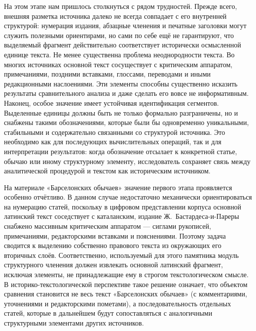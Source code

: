 На этом этапе нам пришлось столкнуться с рядом трудностей. Прежде всего, внешняя разметка источника далеко не всегда совпадает с его внутренней структурой: нумерация издания, абзацные членения и печатные заголовки могут служить полезными ориентирами, но сами по себе ещё не гарантируют, что выделяемый фрагмент действительно соответствует исторически осмысленной единице текста. Не менее существенна проблема неоднородности текста. Во многих источниках основной текст сосуществует с критическим аппаратом, примечаниями, поздними вставками, глоссами, переводами и иными редакционными наслоениями. Эти элементы способны существенно исказить результаты сравнительного анализа и даже сделать его вовсе не информативным. Наконец, особое значение имеет устойчивая идентификация сегментов. Выделенные единицы должны быть не только формально разграничены, но и снабжены такими обозначениями, которые были бы одновременно уникальными, стабильными и содержательно связанными со структурой источника. Это необходимо как для последующих вычислительных операций, так и для интерпретации результатов: когда обозначение отсылает к конкретной статье, обычаю или иному структурному элементу, исследователь сохраняет связь между аналитической процедурой и текстом как историческим источником.

На материале «Барселонских обычаев» значение первого этапа проявляется особенно отчётливо. В данном случае недостаточно механически ориентироваться на нумерацию статей, поскольку в цифровом представлении корпуса основной латинский текст соседствует с каталанским, издание Ж.~Бастардеса-и-Пареры снабжено массивным критическим аппаратом --- сиглами рукописей, примечаниями, редакторскими вставками и пояснениями. Поэтому задача сводится к выделению собственно правового текста из окружающих его вторичных слоёв. Соответственно, используемый для этого памятника модуль структурного членения должен извлекать основной латинский фрагмент, исключая элементы, не принадлежащие ему в строгом текстологическом смысле. В историко-текстологической перспективе такое решение означает, что объектом сравнения становится не весь текст «Барселонских обычаев» (с комментариями, уточнениями и редакторскими пометами), а последовательность отдельных статей, которые в дальнейшем будут сопоставляться с аналогичными структурными элементами других источников.

